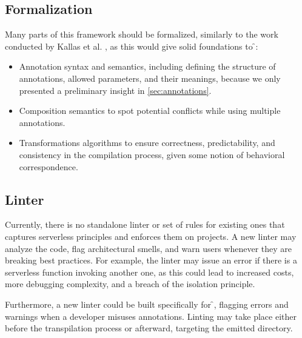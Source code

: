 \subsection{Formalization}

Many parts of this framework should be formalized, similarly to the work conducted by Kallas et al. \cite{formalization},
as this would give solid foundations to \f{}:

\begin{itemize}
  \item Annotation syntax and semantics, including defining
    the structure of annotations, allowed parameters, and their meanings,
    because we only presented a preliminary insight in \cref{sec:annotations}.

  \item Composition semantics to spot potential conflicts while using multiple annotations.

  \item Transformations algorithms to ensure correctness, predictability,
    and consistency in the compilation process, given some notion of behavioral correspondence.
\end{itemize}

\subsection{Linter}

Currently, there is no standalone linter or set of rules for existing ones
that captures serverless principles and enforces them on projects.
A new linter may analyze the code, flag architectural smells,
and warn users whenever they are breaking best practices.
For example, the linter may issue an error if there is a serverless function invoking another one,
as this could lead to increased costs, more debugging complexity, and a breach of the isolation principle.

Furthermore, a new linter could be built specifically for \f{},
flagging errors and warnings when a developer misuses annotations.
Linting may take place either before the transpilation process or afterward, targeting the emitted directory.
